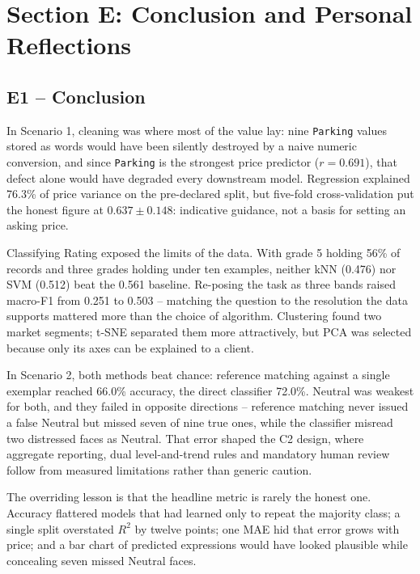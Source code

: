 \documentclass[11pt,a4paper]{article}
\begin{document}
\section{Section E: Conclusion and Personal Reflections}

\subsection{E1 -- Conclusion}

In Scenario 1, cleaning was where most of the value lay: nine \texttt{Parking} values stored as
words would have been silently destroyed by a naive numeric conversion, and since
\texttt{Parking} is the strongest price predictor ($r = 0.691$), that defect alone would have
degraded every downstream model. Regression explained 76.3\% of price variance on the
pre-declared split, but five-fold cross-validation put the honest figure at $0.637 \pm 0.148$:
indicative guidance, not a basis for setting an asking price.

Classifying Rating exposed the limits of the data. With grade 5 holding 56\% of records and
three grades holding under ten examples, neither kNN (0.476) nor SVM (0.512) beat the 0.561
baseline. Re-posing the task as three bands raised macro-F1 from 0.251 to 0.503 -- matching the
question to the resolution the data supports mattered more than the choice of algorithm.
Clustering found two market segments; t-SNE separated them more attractively, but PCA was
selected because only its axes can be explained to a client.

In Scenario 2, both methods beat chance: reference matching against a single exemplar reached
66.0\% accuracy, the direct classifier 72.0\%. Neutral was weakest for both, and they failed in
opposite directions -- reference matching never issued a false Neutral but missed seven of nine
true ones, while the classifier misread two distressed faces as Neutral. That error shaped the
C2 design, where aggregate reporting, dual level-and-trend rules and mandatory human review
follow from measured limitations rather than generic caution.

The overriding lesson is that the headline metric is rarely the honest one. Accuracy flattered
models that had learned only to repeat the majority class; a single split overstated $R^2$ by
twelve points; one MAE hid that error grows with price; and a bar chart of predicted expressions
would have looked plausible while concealing seven missed Neutral faces.
\end{document}
